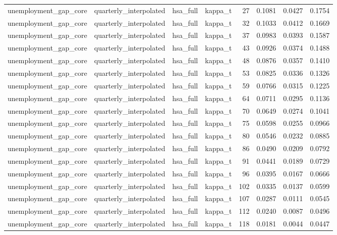 \begin{tabular}{llllrrrr}
unemployment\_gap\_core & quarterly\_interpolated & hsa\_full & kappa\_t & 27 & 0.1081 & 0.0427 & 0.1754 \\
unemployment\_gap\_core & quarterly\_interpolated & hsa\_full & kappa\_t & 32 & 0.1033 & 0.0412 & 0.1669 \\
unemployment\_gap\_core & quarterly\_interpolated & hsa\_full & kappa\_t & 37 & 0.0983 & 0.0393 & 0.1587 \\
unemployment\_gap\_core & quarterly\_interpolated & hsa\_full & kappa\_t & 43 & 0.0926 & 0.0374 & 0.1488 \\
unemployment\_gap\_core & quarterly\_interpolated & hsa\_full & kappa\_t & 48 & 0.0876 & 0.0357 & 0.1410 \\
unemployment\_gap\_core & quarterly\_interpolated & hsa\_full & kappa\_t & 53 & 0.0825 & 0.0336 & 0.1326 \\
unemployment\_gap\_core & quarterly\_interpolated & hsa\_full & kappa\_t & 59 & 0.0766 & 0.0315 & 0.1225 \\
unemployment\_gap\_core & quarterly\_interpolated & hsa\_full & kappa\_t & 64 & 0.0711 & 0.0295 & 0.1136 \\
unemployment\_gap\_core & quarterly\_interpolated & hsa\_full & kappa\_t & 70 & 0.0649 & 0.0274 & 0.1041 \\
unemployment\_gap\_core & quarterly\_interpolated & hsa\_full & kappa\_t & 75 & 0.0598 & 0.0255 & 0.0966 \\
unemployment\_gap\_core & quarterly\_interpolated & hsa\_full & kappa\_t & 80 & 0.0546 & 0.0232 & 0.0885 \\
unemployment\_gap\_core & quarterly\_interpolated & hsa\_full & kappa\_t & 86 & 0.0490 & 0.0209 & 0.0792 \\
unemployment\_gap\_core & quarterly\_interpolated & hsa\_full & kappa\_t & 91 & 0.0441 & 0.0189 & 0.0729 \\
unemployment\_gap\_core & quarterly\_interpolated & hsa\_full & kappa\_t & 96 & 0.0395 & 0.0167 & 0.0666 \\
unemployment\_gap\_core & quarterly\_interpolated & hsa\_full & kappa\_t & 102 & 0.0335 & 0.0137 & 0.0599 \\
unemployment\_gap\_core & quarterly\_interpolated & hsa\_full & kappa\_t & 107 & 0.0287 & 0.0111 & 0.0545 \\
unemployment\_gap\_core & quarterly\_interpolated & hsa\_full & kappa\_t & 112 & 0.0240 & 0.0087 & 0.0496 \\
unemployment\_gap\_core & quarterly\_interpolated & hsa\_full & kappa\_t & 118 & 0.0181 & 0.0044 & 0.0447 \\

\end{tabular}
